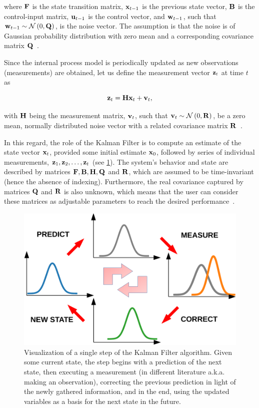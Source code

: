 \noindent  where $\mathbf{F}$ is the state transition matrix, $\mathbf{x}_{t - 1}$ is the previous state vector, $\mathbf{B}$ is the control-input matrix, $\mathbf{u}_{t - 1}$ is the control vector, and $\mathbf{w}_{t - 1}$, such that $\mathbf{w}_{t - 1} \sim \mathcal{N} \left( {0, \mathbf{Q}} \right)$, is the noise vector. The assumption is that the noise is of Gaussian probability distribution with zero mean and a corresponding covariance matrix $\mathbf{Q}$~\cite{kim2018introduction}.

Since the internal process model is periodically updated as new observations (measurements) are obtained, let us define the measurement vector $\mathbf{z}_t$ at time $t$ as

\begin{equation}
    \mathbf{z}_t = \mathbf{H} \mathbf{x}_t + \mathbf{v}_t,
\end{equation}

\noindent with $\mathbf{H}$ being the measurement matrix, $\mathbf{v}_t$, such that $\mathbf{v}_{t} \sim \mathcal{N} \left( {0, \mathbf{R}} \right)$, be a zero mean, normally distributed noise vector with a related covariance matrix $\mathbf{R}$~\cite{kim2018introduction}.

In this regard, the role of the Kalman Filter is to compute an estimate of the state vector $\mathbf{x}_t$, provided some initial estimate $\mathbf{x}_0$, followed by series of individual measurements, $\mathbf{z}_1, \mathbf{z}_2, \dots, \mathbf{z}_t$ (see \cref{fig:KalmanFilterDiagram}). The system's behavior and state are described by matrices $\mathbf{F}, \mathbf{B}, \mathbf{H}, \mathbf{Q}$ and $\mathbf{R}$, which are assumed to be time-invariant (hence the absence of indexing). Furthermore, the real covariance captured by matrices $\mathbf{Q}$ and $\mathbf{R}$ is also unknown, which means that the user can consider these matrices as adjustable parameters to reach the desired performance~\cite{kim2018introduction}.

\begin{figure}[t]
    \centerline{\includegraphics[width=0.7\linewidth]{figures/theoretical_foundations/kalman_filter_diagram.pdf}}
    \caption[A single iteration of the Kalman Filter]{Visualization of a single step of the Kalman Filter algorithm. Given some current state, the step begins with a prediction of the next state, then executing a measurement (in different literature a.k.a. making an observation), correcting the previous prediction in light of the newly gathered information, and in the end, using the updated variables as a basis for the next state in the future.}
    \label{fig:KalmanFilterDiagram}
\end{figure}

